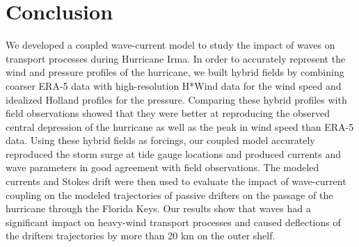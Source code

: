 
\section{Conclusion}

We developed a coupled wave-current model to study the impact of waves on transport processes during Hurricane Irma. In order to accurately represent the wind and pressure profiles of the hurricane, we built hybrid fields by combining coarser ERA-5 data with high-resolution H*Wind data for the wind speed and idealized Holland profiles for the pressure. Comparing these hybrid profiles with field observations showed that they were better at reproducing the observed central depression of the hurricane as well as the peak in wind speed than ERA-5 data. Using these hybrid fields as forcings, our coupled model accurately reproduced the storm surge at tide gauge locations and produced currents and wave parameters in good agreement with field observations. The modeled currents and Stokes drift were then used to evaluate the impact of wave-current coupling on the modeled trajectories of passive drifters on the passage of the hurricane through the Florida Keys. Our results show that waves had a significant impact on heavy-wind transport processes and caused deflections of the drifters trajectories by more than 20 km on the outer shelf.

